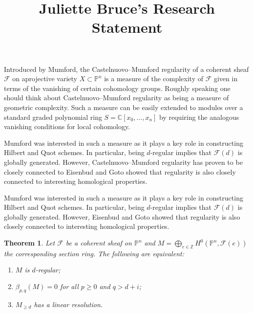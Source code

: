\documentclass[11pt,reqno]{amsart}
\title{Juliette Bruce's Research Statement}
\newtheorem{theorem}[lemma]{Theorem}
\newtheorem{defn}[lemma]{Definition}
\theoremstyle{remark}
\newcommand{\reg}{\operatorname{reg}}
\newcommand{\cF}{\mathcal{F}}
\newcommand{\C}{\mathbb{C}}
\renewcommand{\P}{\mathbb{P}}
\newcommand{\Z}{\mathbb{Z}}
\renewcommand{\cite}[1]{{}}
\begin{document}
 



\setcounter{section}{0}

Introduced by Mumford, the Castelnuovo–Mumford regularity of a coherent sheaf $\cF$ on aprojective variety $X\subset \P^{n}$ is a measure of the complexity of $\cF$ given in terms of the vanishing of certain cohomology groups. Roughly speaking one should think about Castelnuovo--Mumford regularity as being a measure of geometric complexity. Such a measure can be easily extended to modules over a standard graded polynomial ring $S=\C[x_{0},\ldots,x_{n}]$ by requiring the analogous vanishing conditions for local cohomology. 

Mumford was interested in such a measure as it plays a key role in constructing Hilbert and Quot schemes. In particular, being $d$-regular implies that $\cF(d)$ is globally generated. However, Castelnuovo–Mumford regularity has proven to be closely connected to 
Eisenbud and Goto showed that regularity is also closely connected to interesting homological properties.
%

Mumford was interested in such a measure as it plays a key role in constructing Hilbert and Quot schemes. In particular, being $d$-regular implies that $\cF(d)$ is globally generated. However, Eisenbud and Goto showed that regularity is also closely connected to interesting homological properties.

\begin{theorem}\cite{eisenbudGoto84}\label{thm:eisenbud-goto}
Let $\cF$ be a coherent sheaf on $\P^{n}$ and $M=\bigoplus_{e\in\Z} H^0(\P^{n},\cF(e))$ the corresponding section ring. The following are equivalent:
\begin{enumerate}
\item $M$ is $d$-regular;
\item $\beta_{p,q}(M)=0$ for all $p\geq0$ and $q>d+i$;
\item $M_{\geq d}$ has a linear resolution. 
\end{enumerate}
\end{theorem}
\end{document}
